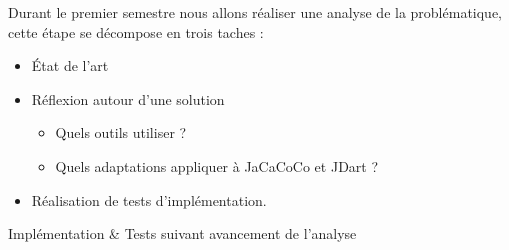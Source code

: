 
Durant le premier semestre nous allons réaliser une analyse de la problématique, cette étape se décompose en trois taches :
\begin{itemize}
	\item État de l'art
	\item Réflexion autour d'une solution
		\begin{itemize}
		 \item Quels outils utiliser ?
		 \item Quels adaptations appliquer à JaCaCoCo et JDart ?
		 
		 
			
		\end{itemize}	
	\item Réalisation de tests d'implémentation.
\end{itemize}
	

Implémentation \& Tests suivant avancement de l'analyse